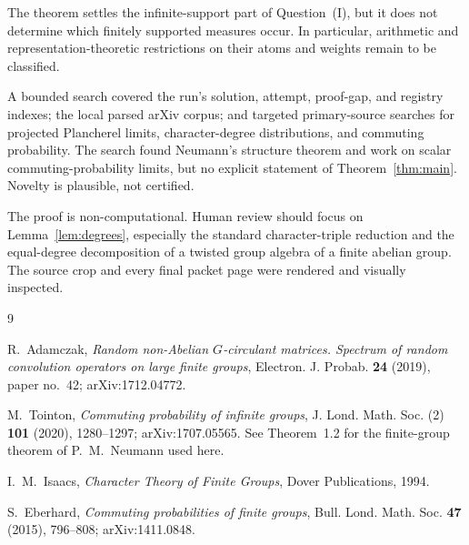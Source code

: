 \documentclass[11pt]{article}
\begin{document}
The theorem settles the infinite-support part of Question~(I), but it does not
determine which finitely supported measures occur.  In particular, arithmetic
and representation-theoretic restrictions on their atoms and weights remain
to be classified.

A bounded search covered the run's solution, attempt, proof-gap, and registry
indexes; the local parsed arXiv corpus; and targeted primary-source searches
for projected Plancherel limits, character-degree distributions, and commuting
probability.  The search found Neumann's structure theorem and work on scalar
commuting-probability limits, but no explicit statement of
Theorem~\ref{thm:main}.  Novelty is plausible, not certified.

The proof is non-computational.  Human review should focus on
Lemma~\ref{lem:degrees}, especially the standard character-triple reduction
and the equal-degree decomposition of a twisted group algebra of a finite
abelian group.  The source crop and every final packet page were rendered and
visually inspected.

\begin{thebibliography}{9}

R.~Adamczak,
\emph{Random non-Abelian $G$-circulant matrices. Spectrum of random
convolution operators on large finite groups},
Electron. J. Probab. \textbf{24} (2019), paper no.~42;
arXiv:1712.04772.

M.~Tointon,
\emph{Commuting probability of infinite groups},
J. Lond. Math. Soc. (2) \textbf{101} (2020), 1280--1297;
arXiv:1707.05565.  See Theorem~1.2 for the finite-group theorem of
P.~M.~Neumann used here.

I.~M.~Isaacs,
\emph{Character Theory of Finite Groups},
Dover Publications, 1994.

S.~Eberhard,
\emph{Commuting probabilities of finite groups},
Bull. Lond. Math. Soc. \textbf{47} (2015), 796--808;
arXiv:1411.0848.

\end{thebibliography}
\end{document}
